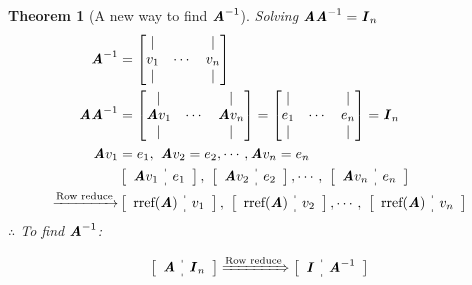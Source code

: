 \documentclass[12pt, a4paper]{article}
\newtheorem{thm}{Theorem}[subsection]
\def\matrixA{\textbf{\emph{A}}}
\def\matrixI{\textbf{\emph{I}}}
\begin{document}
\begin{thm}[A new way to find $\matrixA^{-1}$]
	Solving $\matrixA\matrixA^{-1}=\matrixI_n$
	$$\begin{aligned}
		\matrixA^{-1}&=\begin{bmatrix}|&&|\\v_1&\cdots& v_n\\|&&|\end{bmatrix}\\
		\matrixA\matrixA^{-1}&=\begin{bmatrix}|&&|\\\matrixA v_1&\cdots& \matrixA v_n\\|&&|\end{bmatrix}=\begin{bmatrix}|&&|\\e_1&\cdots& e_n\\|&&|\end{bmatrix}=\matrixI_n \\
		\matrixA v_1&=e_1,\ \matrixA v_2=e_2,\cdots,\matrixA v_n=e_n\\
		&\left[\begin{array}{c:c}\matrixA v_1&e_1\end{array}\right],\  \left[\begin{array}{c:c}\matrixA v_2&e_2\end{array}\right],\cdots,\ \left[\begin{array}{c:c}\matrixA v_n&e_n\end{array}\right]\\
		\xrightarrow[]{\text{Row reduce}}&\left[\begin{array}{c:c}\text{rref}(\matrixA) &v_1\end{array}\right],\  \left[\begin{array}{c:c}\text{rref}(\matrixA)  &v_2\end{array}\right],\cdots,\ \left[\begin{array}{c:c}\text{rref}(\matrixA)  &v_n\end{array}\right]
	\end{aligned}$$
	$\therefore$ To find $\matrixA^{-1}$:
	\begin{tcolorbox}\[\left[\begin{array}{c:c}\matrixA&\matrixI_n\end{array}\right]\xRightarrow{\text{Row reduce}}\left[\begin{array}{c:c}\matrixI&\matrixA^{-1}\end{array}\right]\]\end{tcolorbox}
\end{thm}
\end{document}
